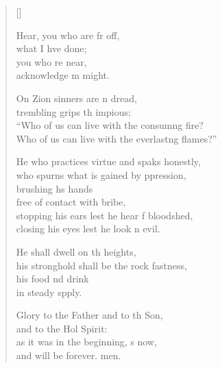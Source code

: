 \settowidth{\versewidth}{Who of us can live with the everlasting flames?”}
\begin{verse}[\versewidth]
  \begin{patverse}
Hear, you who are fr off,\Med\\
what I hve done;\\
you who re near,\Med\\
acknowledge m might.

On Zion sinners are \pointup{\i}n dread,\Med\\
trembling grips th impious;\\
“Who of us can live with the consum\pointup{\i}ng fire?\Med\\
Who of us can live with the everlast\pointup{\i}ng flames?”

He who practices virtue and spaks honestly,\Med\\
who spurns what is gained by ppression,\\
brushing h\pointup{\i}s hands\Med\\
free of contact with  bribe,\\
stopping his ears lest he hear f bloodshed,\Med\\
closing his eyes lest he look n evil.

He shall dwell on th heights,\Med\\
his stronghold shall be the rock fastness,\\
his food nd drink\Med\\
in steady spply.

Glory to the Father and to th Son,\Med\\
and to the Hol Spirit:\\
as it was in the beginning, \pointup{\i}s now,\Med\\
and will be forever. men. 
  \end{patverse}
\end{verse}
